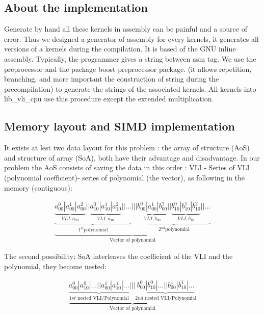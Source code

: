 \documentclass[11pt]{amsart}
\begin{document}
\subsection*{About the implementation}

Generate by hand all these kernels in assembly can be painful and a source of error. Thus we designed a generator of assembly for every kernels, it generates all versions of a kernels during the compilation.   
It is based of the GNU inline assembly. Typically, the programmer gives a string between asm tag. We use the preprocessor and the package boost preprocessor package. 
(it allows repetition, branching, and more important the construction of string during the precompilation) to generate the strings of the associated kernels.
All kernels into lib\_vli\_cpu use this procedure except the extended multiplication.

\subsection*{Memory layout and SIMD implementation}

It exists at lest two data layout for this problem : the array of structure (AoS) and structure of array (SoA), both have their advantage and disadvantage. In our problem the AoS consists of saving the data in this order  : VLI - Series of VLI (polynomial coefficient)- series of polynomial (the vector), as following  in the memory (contiguous):

\begin{eqnarray}
 \underbrace{
 \underbrace{ \underbrace{a^0_{00} | a^1_{00} | a^2_{00}}_{VLI, a_{00} } || \underbrace{a^0_{10} | a^1_{10} | a^2_{10}}_{VLI, a_{10}} ||   \dots  }_{1^{st} \textrm{polynomial}} 
      |||    \underbrace{ \underbrace{b^0_{00} | a^1_{00} | b^2_{00}}_{VLI, b_{00} } || \underbrace{b^0_{10} | b^1_{10} | b^2_{10}}_{VLI, b_{10}} ||   \dots  }_{2^{nd} \textrm{polynomial} } }_{\textrm{Vector of polynomial}} \nonumber
\end{eqnarray}

The second possibility; SoA interleaves the coefficient of the VLI and the polynomial, they become nested:

\begin{eqnarray}
 \underbrace{
 \underbrace{a^0_{00} | a^0_{10} | \dots || a^1_{00} | a^1_{10} | \dots  }_{1st  \textrm{ nested VLI/Polynomial} } |||  \underbrace{b^0_{00} | b^0_{10} | \dots || b^1_{00} | b^1_{10} | \dots  }_{2nd  \textrm{ nested VLI/Polynomial} }
 }_{\textrm{Vector of polynomial}} \nonumber
\end{eqnarray}
\end{document}
